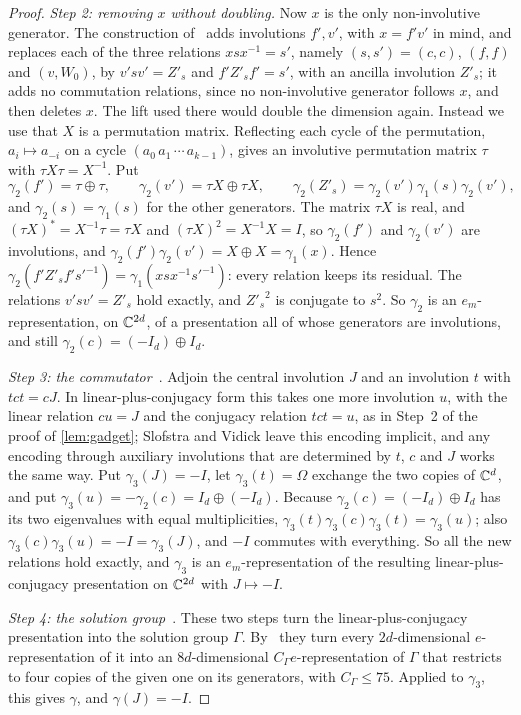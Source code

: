 \begin{proof}
\emph{Step 2: removing $x$ without doubling.} Now $x$ is the only non-involutive generator. The construction
of~\cite[Proposition~4.8]{Slo19} adds involutions
$f',v'$, with $x=f'v'$ in mind, and replaces each of the three relations $xsx^{-1}=s'$, namely $(s,s')=(c,c)$, $(f,f)$ and $(v,W_0)$, by
$v'sv'=Z'_s$ and $f'Z'_sf'=s'$, with an ancilla involution $Z'_s$; it adds no commutation relations, since no non-involutive generator
follows $x$, and then deletes $x$. The lift used there would double the dimension again. Instead we use that $X$ is a permutation matrix.
Reflecting each cycle of the permutation, $a_i\mapsto a_{-i}$ on a cycle $(a_0\,a_1\,\cdots\,a_{k-1})$, gives an involutive permutation
matrix $\tau$ with $\tau X\tau=X^{-1}$. Put
\[
\gamma_2(f')=\tau\oplus\tau,\qquad\gamma_2(v')=\tau X\oplus\tau X,\qquad\gamma_2(Z'_s)=\gamma_2(v')\gamma_1(s)\gamma_2(v'),
\]
and $\gamma_2(s)=\gamma_1(s)$ for the other generators. The matrix $\tau X$ is real, and $(\tau X)^*=X^{-1}\tau=\tau X$ and $(\tau X)^2=X^{-1}X=I$,
so $\gamma_2(f')$ and $\gamma_2(v')$ are involutions, and $\gamma_2(f')\gamma_2(v')=X\oplus X=\gamma_1(x)$. Hence
$\gamma_2(f'Z'_sf's'^{-1})=\gamma_1(xsx^{-1}s'^{-1})$: every relation keeps its residual. The relations $v'sv'=Z'_s$ hold exactly, and
${Z'_s}^2$ is conjugate to $s^2$. So $\gamma_2$ is an $e_m$-representation, on $\mathbb C^{2d}$, of a presentation all of whose generators are
involutions, and still $\gamma_2(c)=(-I_d)\oplus I_d$.

\emph{Step 3: the commutator}~\cite[proof of Proposition~6.2]{SV18}. Adjoin the central involution $J$ and an involution $t$ with
$tct=cJ$. In linear-plus-conjugacy form this takes one more involution $u$, with the linear relation $cu=J$ and the conjugacy relation
$tct=u$, as in Step~2 of the proof of \cref{lem:gadget}; Slofstra and Vidick leave this encoding implicit, and any encoding through
auxiliary involutions that are determined by $t$, $c$ and $J$ works the same way. Put $\gamma_3(J)=-I$, let $\gamma_3(t)=\Omega$ exchange the
two copies of $\mathbb C^d$, and put $\gamma_3(u)=-\gamma_2(c)=I_d\oplus(-I_d)$. Because $\gamma_2(c)=(-I_d)\oplus I_d$ has its two eigenvalues with
equal multiplicities, $\gamma_3(t)\gamma_3(c)\gamma_3(t)=\gamma_3(u)$; also $\gamma_3(c)\gamma_3(u)=-I=\gamma_3(J)$, and $-I$ commutes with
everything. So all the new relations hold exactly, and $\gamma_3$ is an $e_m$-representation of the resulting linear-plus-conjugacy
presentation on $\mathbb C^{2d}$ with $J\mapsto-I$.

\emph{Step 4: the solution group}~\cite[Lemma~4.4 and Proposition~4.2]{Slo19}. These two steps turn the linear-plus-conjugacy presentation
into the solution group $\Gamma$. By~\cite[Remark~4.5]{Slo19} they turn every $2d$-dimensional $e$-representation of it into an
$8d$-dimensional $C_\Gamma e$-representation of $\Gamma$ that restricts to four copies of the given one on its generators, with
$C_\Gamma\le75$. Applied to $\gamma_3$, this gives $\gamma$, and $\gamma(J)=-I$.
\end{proof}

